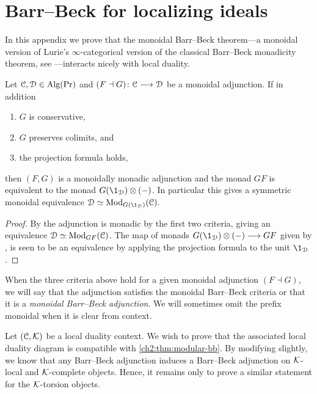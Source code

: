 

\section{Barr--Beck for localizing ideals}
\label{ch2:app:barr-beck}

In this appendix we prove that the monoidal Barr--Beck theorem---a monoidal version of Lurie's $\infty$-categorical version of the classical Barr--Beck monadicity theorem, see \cite[Section 4.7]{Lurie_HA}---interacts nicely with local duality.

\begin{theorem}
    \label{ch2:thm:modular-bb}
    Let $\EuScript{C}, \EuScript{D} \in \operatorname{Alg}(\Pr)$ and $(F\dashv G)\colon \EuScript{C}\longrightarrow \EuScript{D}$ be a monoidal adjunction. If in addition 
    \begin{enumerate}
        \item $G$ is conservative, 
        \item $G$ preserves colimits, and
        \item the projection formula holds,
    \end{enumerate}
    then $(F,G)$ is a monoidally monadic adjunction and the monad $GF$ is equivalent to the monad $G(\1_\D)\otimes (-)$. In particular this gives a symmetric monoidal equivalence $\D\simeq \Mod_{G(\1_\D)}(\C).$
\end{theorem}
\begin{proof}
    By \cite[4.7.3.5]{Lurie_HA} the adjunction is monadic by the first two criteria, giving an equivalence $\EuScript{D}\simeq \mathrm{Mod}_{GF}(\EuScript{C})$. The map of monads $G(\1_\D)\otimes (-)\to GF$ given by \cite[3.6]{elmanto-kolderup_2020}, is seen to be an equivalence by applying the projection formula to the unit $\1_\D$. 
\end{proof}

\begin{definition}
    When the three criteria above hold for a given monoidal adjunction $(F\dashv G)$, we will say that the adjunction satisfies the monoidal Barr--Beck criteria or that it is a \emph{monoidal Barr--Beck adjunction}. We will sometimes omit the prefix monoidal when it is clear from context. 
\end{definition}

Let $(\EuScript{C}, \mathcal{K})$ be a local duality context. We wish to prove that the associated local duality diagram is compatible with \cref{ch2:thm:modular-bb}. By modifying \cite[3.7]{behrens-shaw_2020} slightly, we know that any Barr--Beck adjunction induces a Barr--Beck adjunction on $\mathcal{K}$-local and $\mathcal{K}$-complete objects. Hence, it remains only to prove a similar statement for the $\mathcal{K}$-torsion objects. 

